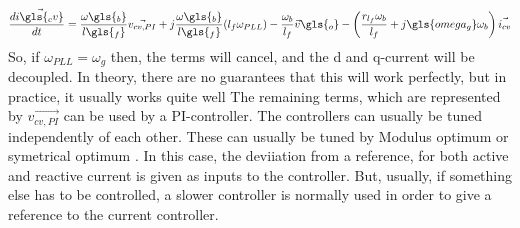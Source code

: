 \begin{align}
 \frac{d \Vec{i\gls{_cv}}}{dt} &= \frac{\omega\gls{_b}}{l\gls{_f}}\Vec{v_{cv,PI}} + j\frac{\omega\gls{_b}}{l\gls{_f}}( l_f \omega_{PLL} ) - \frac{\omega_b}{l_f}\Vec{v}\gls{_o} - \left( \frac{r_{l_f}\omega_b}{l_f} + j\gls{omega_g}\omega_b \right) \Vec{i_{cv}}\\
\end{align}{}
So, if $\omega_{PLL} = \omega_g$ then, the terms will cancel, and the d and q-current will be decoupled. In theory, there are no guarantees that this will work perfectly, but in practice, it usually works quite well \cite{Suul_electro_presentation_1}
The remaining terms, which are represented by $\Vec{v_{cv,PI}}$ can be used by a PI-controller. The controllers can usually be tuned independently of each other. These can usually be tuned by Modulus optimum or symetrical optimum \cite{Suul_electro_presentation_1,Suul_paper_2}. In this case, the deviiation from a reference, for both active and reactive current is given as inputs to the controller. But, usually, if something else has to be controlled, a slower controller is normally used in order to give a reference to the current controller. 


